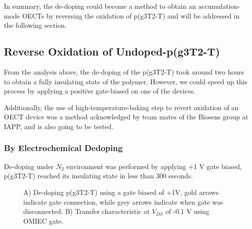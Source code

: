In summary, the de-doping could become a method to obtain an accumulation-mode OECTs by reversing the oxidation of p(g3T2-T) and will be addressed in the following section.

\subsection{Reverse Oxidation of Undoped-p(g3T2-T)}
From the analysis above, the de-doping of the p(g3T2-T) took around two hours to obtain a fully insulating state of the polymer. However, we could speed up this process by applying a positive gate-biased on one of the devices.

Additionally, the use of high-temperature-baking step to revert oxidation of an OECT device was a method acknowledged by team mates of the Biosens group at IAPP, and is also going to be tested.   

\subsubsection{By Electrochemical Dedoping}
De-doping under $N_{2}$ environment was performed by applying +1 V gate biased, p(g3T2-T) reached its insulating state in less than 300 seconds. 

\begin{figure}[ht]
    \centering
    \caption[Electrochemical de-doping of oxidized p(g3T2-T) OECT]{A) De-doping p(g3T2-T) using a gate biased of +1V, gold arrows indicate gate connection, while grey arrows indicate when gate was disconnected. B) Transfer characteristic at $V_{DS}$ of -0.1 V using OMIEC gate.}
    \label{fig:revox2}
\end{figure}


